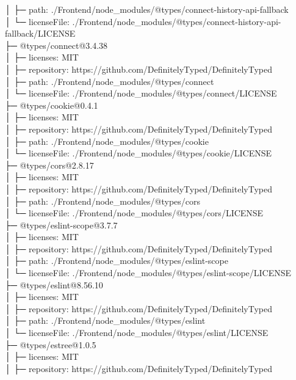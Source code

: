 │  ├─ path: ./Frontend/node\_modules/@types/connect-history-api-fallback\\
│  └─ licenseFile: ./Frontend/node\_modules/@types/connect-history-api-fallback/LICENSE\\
├─ @types/connect@3.4.38\\
│  ├─ licenses: MIT\\
│  ├─ repository: https://github.com/DefinitelyTyped/DefinitelyTyped\\
│  ├─ path: ./Frontend/node\_modules/@types/connect\\
│  └─ licenseFile: ./Frontend/node\_modules/@types/connect/LICENSE\\
├─ @types/cookie@0.4.1\\
│  ├─ licenses: MIT\\
│  ├─ repository: https://github.com/DefinitelyTyped/DefinitelyTyped\\
│  ├─ path: ./Frontend/node\_modules/@types/cookie\\
│  └─ licenseFile: ./Frontend/node\_modules/@types/cookie/LICENSE\\
├─ @types/cors@2.8.17\\
│  ├─ licenses: MIT\\
│  ├─ repository: https://github.com/DefinitelyTyped/DefinitelyTyped\\
│  ├─ path: ./Frontend/node\_modules/@types/cors\\
│  └─ licenseFile: ./Frontend/node\_modules/@types/cors/LICENSE\\
├─ @types/eslint-scope@3.7.7\\
│  ├─ licenses: MIT\\
│  ├─ repository: https://github.com/DefinitelyTyped/DefinitelyTyped\\
│  ├─ path: ./Frontend/node\_modules/@types/eslint-scope\\
│  └─ licenseFile: ./Frontend/node\_modules/@types/eslint-scope/LICENSE\\
├─ @types/eslint@8.56.10\\
│  ├─ licenses: MIT\\
│  ├─ repository: https://github.com/DefinitelyTyped/DefinitelyTyped\\
│  ├─ path: ./Frontend/node\_modules/@types/eslint\\
│  └─ licenseFile: ./Frontend/node\_modules/@types/eslint/LICENSE\\
├─ @types/estree@1.0.5\\
│  ├─ licenses: MIT\\
│  ├─ repository: https://github.com/DefinitelyTyped/DefinitelyTyped\\
